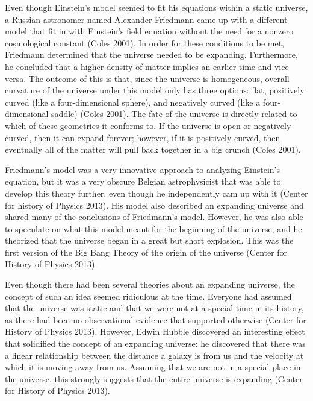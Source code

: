\documentclass[12pt]{article}
\begin{document}
Even though Einstein's model seemed to fit his equations within a static
universe, a Russian astronomer named Alexander Friedmann came up with a
different model that fit in with Einstein's field equation without the need for
a nonzero cosmological constant (Coles 2001).  In order for these conditions to
be met, Friedmann determined that the universe needed to be expanding.
Furthermore, he concluded that a higher density of matter implies an earlier
time and vice versa.  The outcome of this is that, since the universe is
homogeneous, overall curvature of the universe under this model only has three
options: flat, positively curved (like a four-dimensional sphere),
and negatively curved (like a four-dimensional saddle) (Coles 2001).  The fate
of the universe is directly related to which of these geometries it conforms to.
If the universe is open or negatively curved, then it can expand forever;
however, if it is positively curved, then eventually all of the matter will pull
back together in a big crunch (Coles 2001).

Friedmann's model was a very innovative approach to analyzing Einstein's
equation, but it was a very obscure Belgian astrophysicist that was able to
develop this theory further, even though he independently cam up with it (Center
for history of Physics 2013).  His
model also described an expanding universe and shared many of the conclusions of
Friedmann's model.  However, he was also able to speculate on what this model
meant for the beginning of the universe, and he theorized that the universe
began in a great but short explosion.  This was the first version of the Big
Bang Theory of the origin of the universe (Center for History of Physics 2013).

Even though there had been several theories about an expanding universe, the
concept of such an idea seemed ridiculous at the time.  Everyone had assumed
that the universe was static and that we were not at a special time in its
history, as there had been no observational evidence that supported otherwise
(Center for History of Physics 2013).
However, Edwin Hubble discovered an interesting effect that solidified the
concept of an expanding universe: he discovered that there was a linear
relationship between the distance a galaxy is from us and the velocity at which
it is moving away from us.  Assuming that we are not in a special place in the
universe, this strongly suggests that the entire universe is expanding (Center
for History of Physics 2013).
\end{document}
